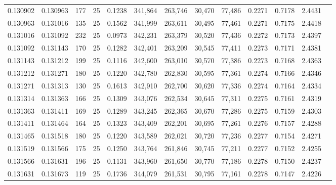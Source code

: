 \begin{tabular}{rrrrrrrrrrrrr}
0.130902 & 0.130963 &   177 &  25 &                                     0.1238 & 341,864 & 263,746 &  30,470 &  77,486 & 0.2271 & 0.7178 & 2.4431 \\
0.130963 & 0.131016 &   135 &  25 &                                     0.1562 & 341,999 & 263,611 &  30,495 &  77,461 & 0.2271 & 0.7175 & 2.4418 \\
0.131016 & 0.131092 &   232 &  25 &                                     0.0973 & 342,231 & 263,379 &  30,520 &  77,436 & 0.2272 & 0.7173 & 2.4397 \\
0.131092 & 0.131143 &   170 &  25 &                                     0.1282 & 342,401 & 263,209 &  30,545 &  77,411 & 0.2273 & 0.7171 & 2.4381 \\
0.131143 & 0.131212 &   199 &  25 &                                     0.1116 & 342,600 & 263,010 &  30,570 &  77,386 & 0.2273 & 0.7168 & 2.4363 \\
0.131212 & 0.131271 &   180 &  25 &                                     0.1220 & 342,780 & 262,830 &  30,595 &  77,361 & 0.2274 & 0.7166 & 2.4346 \\
0.131271 & 0.131313 &   130 &  25 &                                     0.1613 & 342,910 & 262,700 &  30,620 &  77,336 & 0.2274 & 0.7164 & 2.4334 \\
0.131314 & 0.131363 &   166 &  25 &                                     0.1309 & 343,076 & 262,534 &  30,645 &  77,311 & 0.2275 & 0.7161 & 2.4319 \\
0.131363 & 0.131411 &   169 &  25 &                                     0.1289 & 343,245 & 262,365 &  30,670 &  77,286 & 0.2275 & 0.7159 & 2.4303 \\
0.131411 & 0.131464 &   164 &  25 &                                     0.1323 & 343,409 & 262,201 &  30,695 &  77,261 & 0.2276 & 0.7157 & 2.4288 \\
0.131465 & 0.131518 &   180 &  25 &                                     0.1220 & 343,589 & 262,021 &  30,720 &  77,236 & 0.2277 & 0.7154 & 2.4271 \\
0.131519 & 0.131566 &   175 &  25 &                                     0.1250 & 343,764 & 261,846 &  30,745 &  77,211 & 0.2277 & 0.7152 & 2.4255 \\
0.131566 & 0.131631 &   196 &  25 &                                     0.1131 & 343,960 & 261,650 &  30,770 &  77,186 & 0.2278 & 0.7150 & 2.4237 \\
0.131631 & 0.131673 &   119 &  25 &                                     0.1736 & 344,079 & 261,531 &  30,795 &  77,161 & 0.2278 & 0.7147 & 2.4226 \\

\end{tabular}
